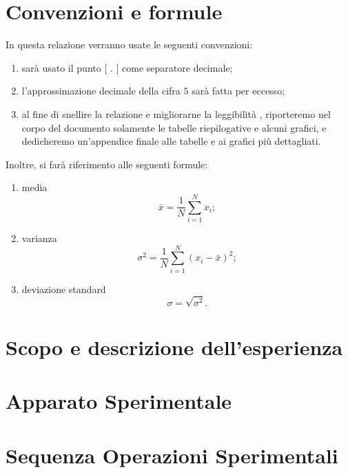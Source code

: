 \documentclass[10pt,oneside,a4paper]{article}
\begin{document}
\section{Convenzioni e formule}
In questa relazione verranno usate le seguenti convenzioni:
\begin{enumerate}
	\item sarà usato il punto [ $.$ ] come separatore decimale;
	\item l'approssimazione decimale della cifra $5$ sarà fatta per eccesso;
	\item al fine di snellire la relazione e migliorarne la leggibilità , riporteremo nel corpo del documento solamente le tabelle riepilogative e alcuni grafici, e dedicheremo un'appendice finale alle tabelle e ai grafici più dettagliati.
\end{enumerate}
Inoltre, si farà riferimento alle seguenti formule:
\begin{enumerate}
	\item media 
	\begin{equation}\label{eq:media}
	\bar{x} = \frac{1}{N}\sum_{i=1}^Nx_i;
	\end{equation}
	\item varianza
	\begin{equation}\label{eq:varianza}
	\sigma^2 = \frac{1}{N}\sum_{i=1}^N(x_i-\bar{x})^2;
	\end{equation}
	\item deviazione standard
	\begin{equation}\label{eq:deviazione}
	\sigma = \sqrt{\sigma^2}.
	\end{equation}	
\end{enumerate}


\section{Scopo e descrizione dell'esperienza}
\label{sec:descrizione}



\section{Apparato Sperimentale}


\section{Sequenza Operazioni Sperimentali} 
\end{document}
